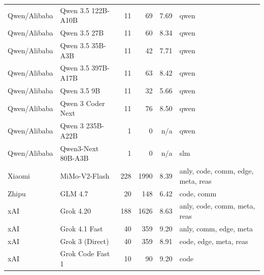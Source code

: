 \begin{longtable}{llrrrp{3.0cm}}
Qwen/Alibaba & Qwen 3.5 122B-A10B & 11 & 69 & 7.69 & qwen \\
Qwen/Alibaba & Qwen 3.5 27B & 11 & 60 & 8.34 & qwen \\
Qwen/Alibaba & Qwen 3.5 35B-A3B & 11 & 42 & 7.71 & qwen \\
Qwen/Alibaba & Qwen 3.5 397B-A17B & 11 & 63 & 8.42 & qwen \\
Qwen/Alibaba & Qwen 3.5 9B & 11 & 32 & 5.66 & qwen \\
Qwen/Alibaba & Qwen 3 Coder Next & 11 & 76 & 8.50 & qwen \\
Qwen/Alibaba & Qwen 3 235B-A22B & 1 & 0 & n/a & qwen \\
Qwen/Alibaba & Qwen3-Next 80B-A3B & 1 & 0 & n/a & slm \\
Xiaomi & MiMo-V2-Flash & 228 & 1990 & 8.39 & anly, code, comm, edge, meta, reas \\
Zhipu & GLM 4.7 & 20 & 148 & 6.42 & code, comm \\
xAI & Grok 4.20 & 188 & 1626 & 8.63 & anly, code, comm, meta, reas \\
xAI & Grok 4.1 Fast & 40 & 359 & 9.20 & anly, comm, edge, meta \\
xAI & Grok 3 (Direct) & 40 & 359 & 8.91 & code, edge, meta, reas \\
xAI & Grok Code Fast 1 & 10 & 90 & 9.20 & code \\
\end{longtable}
\normalsize